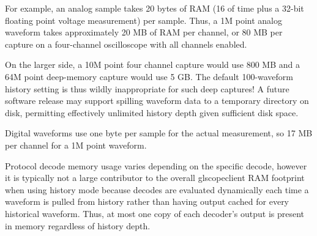 For example, an analog sample takes 20 bytes of RAM (16 of time plus a 32-bit floating point voltage measurement) per
sample. Thus, a 1M point analog waveform takes approximately 20 MB of RAM per channel, or 80 MB per capture on a
four-channel oscilloscope with all channels enabled.

On the larger side, a 10M point four channel capture would use 800 MB and a 64M point deep-memory capture would use 5
GB. The default 100-waveform history setting is thus wildly inappropriate for such deep captures! A future software
release may support spilling waveform data to a temporary directory on disk, permitting effectively unlimited history
depth given sufficient disk space.

Digital waveforms use one byte per sample for the actual measurement, so 17 MB per channel for a 1M point waveform.

Protocol decode memory usage varies depending on the specific decode, however it is typically not a large contributor
to the overall glscopeclient RAM footprint when using history mode because decodes are evaluated dynamically each time
a waveform is pulled from history rather than having output cached for every historical waveform. Thus, at most one
copy of each decoder's output is present in memory regardless of history depth.
